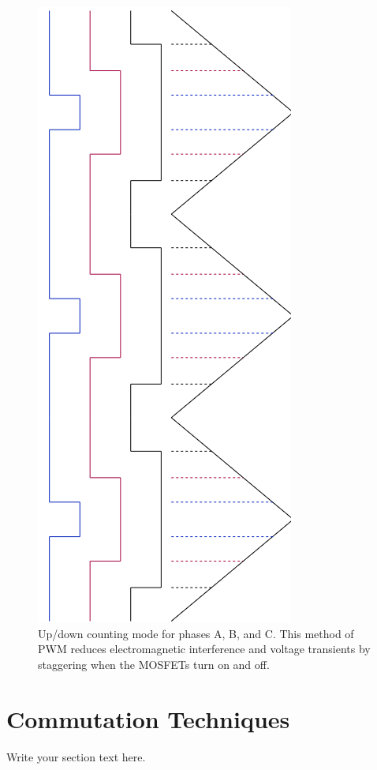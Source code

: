 \documentclass{article}
\begin{document}
			
			\begin{figure}[!h]
				\begin{center}
					\includegraphics[scale=0.5, angle=90]{UpDownCountingMode}
				\end{center}
				\caption{Up/down counting mode for phases A, B, and C.  This method of PWM reduces electromagnetic interference and voltage transients by staggering when the MOSFETs turn on and off.}
				\label{fig:UpDownCountingMode}
			\end{figure}
	
	\section{Commutation Techniques}
	Write your section text here.
	
\end{document}
